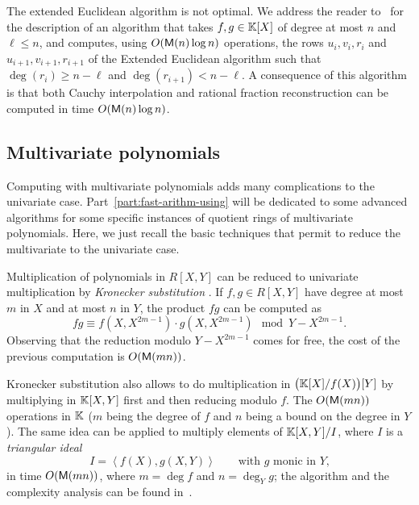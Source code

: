 The extended Euclidean algorithm is not optimal. We address the reader
to~\cite[$\S$11.1]{vzGG} for the description of an algorithm that
takes $f,g\in\mathbb{K}[X]$ of degree at most $n$ and $\ell\le n$, and
computes, using $O(\mathsf{M}(n)\log n)$ operations, the rows $u_i,v_i,r_i$
and $u_{i+1},v_{i+1},r_{i+1}$ of the Extended Euclidean algorithm such
that $\deg(r_i)\ge n-\ell$ and $\deg(r_{i+1})<n-\ell$. A consequence
of this algorithm is that both Cauchy interpolation and rational
fraction reconstruction can be computed in time $O(\mathsf{M}(n)\log n)$.



\subsection{Multivariate polynomials}
\label{sec:mult-polyn}
Computing with multivariate polynomials adds many complications to the
univariate case. Part~\ref{part:fast-arithm-using} will be dedicated
to some advanced algorithms for some specific instances of quotient
rings of multivariate polynomials. Here, we just recall the basic
techniques that permit to reduce the multivariate to the univariate
case.

Multiplication of polynomials in $R[X,Y]$ can be reduced to univariate
multiplication by \textit{Kronecker
  substitution} \cite{vzGG,vzgathen+shoup92,harvey09}. If $f,g\in
R[X,Y]$ have degree at most $m$ in $X$ and at most $n$ in $Y$, the
product $fg$ can be computed as
\begin{equation}
  \label{eq:222}
  fg \equiv f(X,X^{2m-1})\cdot g(X,X^{2m-1}) \mod Y-X^{2m-1}
  \text{.}
\end{equation}
Observing that the reduction modulo $Y-X^{2m-1}$ comes for free, the
cost of the previous computation is $O(\mathsf{M}(mn))$.

Kronecker substitution also allows to do multiplication in
$\bigl(\mathbb{K}[X]/f(X)\bigr)[Y]$ by multiplying in $\mathbb{K}[X,Y]$ first and then
reducing modulo $f$. The $O(\mathsf{M}(mn))$ operations in $\mathbb{K}$ ($m$ being
the degree of $f$ and $n$ being a bound on the degree in $Y$). The
same idea can be applied to multiply elements of $\mathbb{K}[X,Y]/I$, where $I$
is a \emph{triangular ideal}
\begin{equation}
  \label{eq:228}
  I = \left\langle f(X), g(X,Y)\right\rangle
  \qquad\text{with $g$ monic in $Y$,}
\end{equation}
in time $O(\mathsf{M}(mn))$, where $m=\deg f$ and $n=\deg_Y g$; the
algorithm and the complexity analysis can be found
in~\cite[Proposition~4]{pascal+schost06}.

